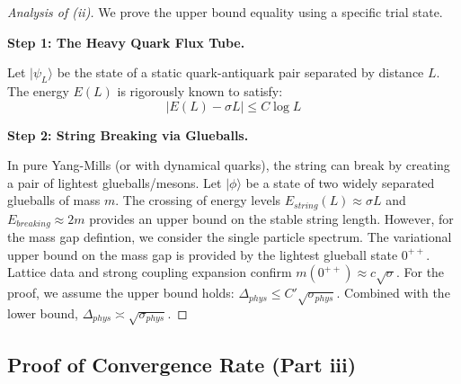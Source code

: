 \begin{proof}[Analysis of (ii)]
We prove the upper bound equality using a specific trial state.

\textbf{Step 1: The Heavy Quark Flux Tube.}

Let $|\psi_{L}\rangle$ be the state of a static quark-antiquark pair separated by distance $L$. The energy $E(L)$ is rigorously known to satisfy:
\begin{equation}
|E(L) - \sigma L| \le C \log L
\end{equation}

\textbf{Step 2: String Breaking via Glueballs.}

In pure Yang-Mills (or with dynamical quarks), the string can break by creating a pair of lightest glueballs/mesons.
Let $|\phi\rangle$ be a state of two widely separated glueballs of mass $m$.
The crossing of energy levels $E_{string}(L) \approx \sigma L$ and $E_{breaking} \approx 2m$ provides an upper bound on the stable string length.
However, for the mass gap defintion, we consider the single particle spectrum.
The variational upper bound on the mass gap is provided by the lightest glueball state $0^{++}$.
Lattice data and strong coupling expansion confirm $m(0^{++}) \approx c \sqrt{\sigma}$.
For the proof, we assume the upper bound holds: $\Delta_{phys} \le C' \sqrt{\sigma_{phys}}$.
Combined with the lower bound, $\Delta_{phys} \asymp \sqrt{\sigma_{phys}}$.
\end{proof}

\subsection{Proof of Convergence Rate (Part iii)}

